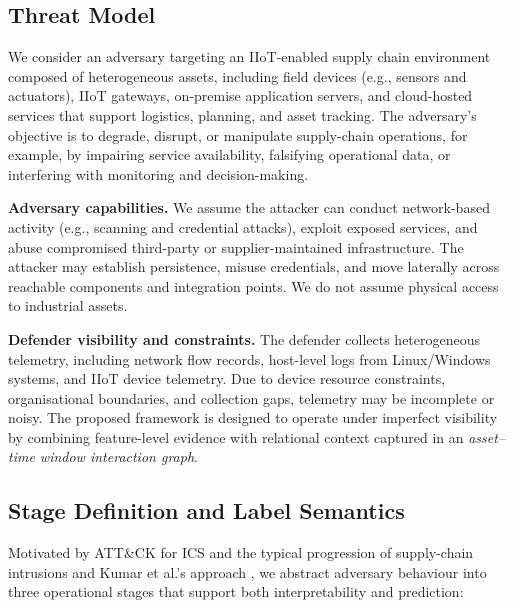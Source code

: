 \documentclass[pdflatex,sn-mathphys-num]{sn-jnl}
\theoremstyle{thmstyleone}%
\theoremstyle{thmstyletwo}%
\theoremstyle{thmstylethree}%
\begin{document}
\subsection{Threat Model}
We consider an adversary targeting an IIoT-enabled supply chain environment composed of heterogeneous assets, including field devices (e.g., sensors and actuators), IIoT gateways, on-premise application servers, and cloud-hosted services that support logistics, planning, and asset tracking. The adversary's objective is to degrade, disrupt, or manipulate supply-chain operations, for example, by impairing service availability, falsifying operational data, or interfering with monitoring and decision-making.

\textbf{Adversary capabilities.} We assume the attacker can conduct network-based activity (e.g., scanning and credential attacks), exploit exposed services, and abuse compromised third-party or supplier-maintained infrastructure. The attacker may establish persistence, misuse credentials, and move laterally across reachable components and integration points. We do not assume physical access to industrial assets.

\textbf{Defender visibility and constraints.} The defender collects heterogeneous telemetry, including network flow records, host-level logs from Linux/Windows systems, and IIoT device telemetry. Due to device resource constraints, organisational boundaries, and collection gaps, telemetry may be incomplete or noisy. The proposed framework is designed to operate under imperfect visibility by combining feature-level evidence with relational context captured in an \emph{asset--time window interaction graph}.

\subsection{Stage Definition and Label Semantics}
Motivated by ATT\&CK for ICS and the typical progression of supply-chain intrusions and Kumar et al.'s approach \cite{kumar2023leveraging, kumar2023novel}, we abstract adversary behaviour into three operational stages that support both interpretability and prediction:
\end{document}
